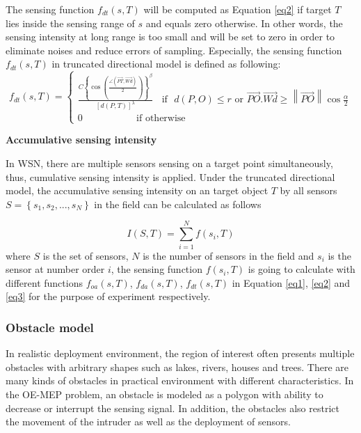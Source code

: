\documentclass[final]{elsarticle}
\begin{document}
The sensing function $f_{dt}(s,T)$ will be computed as Equation \eqref{eq2} if target $T$ lies inside the sensing range of $s$ and equals zero otherwise. In other words, the sensing intensity at long range is too small and will be set to zero in order to eliminate noises and reduce errors of sampling. Especially, the sensing function $f_{dt}(s,T)$ in truncated directional model is defined as following:
\begin{equation}
\label{eq3}
f_{dt}({s},T) = \left\{
\begin{aligned}
 \frac {{C{{\left\{ {\cos \left( {\frac{{\angle (\overrightarrow {PT} ,\overrightarrow {Wd}) }}{2}} \right)} \right\}}}^\beta }} {{{{\left[ {d(P,T)} \right]}^\lambda }}} \:\:\:\:\text{if} \:\:\: d(P,O) \le r \text{ or } \overrightarrow {PO} .\overrightarrow {Wd}  \ge \left\| {\overrightarrow {PO} } \right\|\cos \frac{\alpha}{2} \\
 0 \:\:\:\:\:\:\:\:\:\:\:\:\:\:\:\:\:\:\:\:\:\:\:\:\:\text{if  otherwise}\:\:\:\:\:\:\:\:\:\:\:\:\:\:\:\:\:\:\:\:\:\:\:\:\:\:\:\:\:\:\:\:\:\:\:\:\:\:\:\:\:\:\:\:\:\:\:\:\:\:\:\:\:\:\:\:\:\:
\end{aligned}
\right.
\end{equation}

\noindent\textbf{Accumulative sensing intensity}

In WSN, there are multiple sensors sensing on a target point simultaneously, thus, cumulative sensing intensity is applied. Under the truncated directional model, the accumulative sensing intensity on an target object $ T $ by all sensors $S = \left\{ {{s_1},{s_2},...,{s_N}} \right\}$ in the field can be calculated as follows

\begin{equation}
\label{eq4}
I(S, T) = \sum\limits_{i = 1}^{N} {f({s_i},T)} 
\end{equation}
where $ S $ is the set of sensors, $ N $ is the number of sensors in the field and $s_i$ is the sensor at number order $ i $, the sensing function $ f({s_i},T)$ is going to calculate with different functions $f_{oa}({s},T)$,  $ f_{da}({s},T) $, $f_{dt}({s},T)$ in Equation \eqref{eq1}, \eqref{eq2} and \eqref{eq3} for the purpose of experiment respectively. 

\subsubsection{Obstacle model}
In realistic deployment environment, the region of interest often presents multiple obstacles with arbitrary shapes such as lakes, rivers, houses and trees. There are many kinds of obstacles in practical environment with different characteristics. In the OE-MEP problem, an obstacle is modeled as a polygon with ability to decrease or interrupt the sensing signal. In addition, the obstacles also restrict the movement of the intruder as well as the deployment of sensors. 
\end{document}
